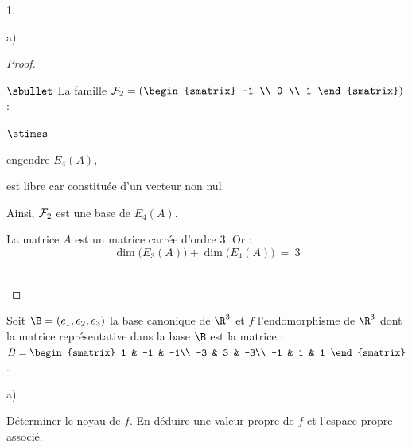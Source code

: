\documentclass[11pt]{article}%
\begin{document}
\begin{noliste}{1.}
\begin{noliste}{a)}
\begin{proof}
\begin{noliste}{$\sbullet$}
          \noindent
          La famille ${\cal F}_2 = \left(
          \begin{smatrix}
            -1 \\
            0 \\
            1
            \end{smatrix}
          \right)$ :
          \begin{noliste}{$\stimes$}
          \item engendre $E_4(A)$,
          \item est libre car constituée d'un vecteur non nul.
          \end{noliste}
          Ainsi, ${\cal F}_2$ est une base de $E_4(A)$.%

      \item La matrice $A$ est un matrice carrée d'ordre $3$. Or :
        \[
        \dim\big( E_3(A) \big) + \dim\big( E_4(A) \big) \ = \ 3
        \]
        ~\\[-1.2cm]
      \end{noliste}
    \end{proof}

  \end{noliste}

\item Soit $\B = (e_{1},e_{2},e_{3})$ la base canonique de $\R^{3}$ et
  $f$ l'endomorphisme de $\R^{3}$ dont la matrice représentative dans
  la base $\B$ est la matrice : $B =
  \begin{smatrix}
    1 & -1 & -1\\
    -3 & 3 & -3\\
    -1 & 1 & 1
  \end{smatrix}
  $.
  \begin{noliste}{a)}
    \setlength{\itemsep}{2mm}
  \item Déterminer le noyau de $f$. En déduire une valeur propre de
    $f$ et l'espace propre associé.


\end{noliste}
\end{noliste}
\end{document}
